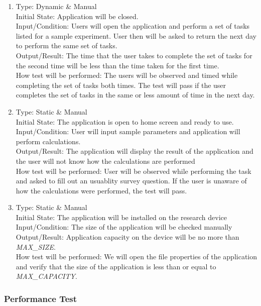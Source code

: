 \documentclass[12pt, titlepage]{article}
\begin{document}
\begin{adjustwidth}{2.2em}{0pt}
\begin{enumerate}[{NF-UT}1.]
  \item Type: Dynamic \& Manual\\
  Initial State: Application will be closed.\\
  Input/Condition: Users will open the application and perform a set of tasks listed for a sample experiment. User then will be asked to return the next day to perform the same set of tasks.\\
  Output/Result:  The time that the user takes to complete the set of tasks for the second time will be less than the time taken for the first time.\\
  How test will be performed: The users will be observed and timed while completing the set of tasks both times. The test will pass if the user completes the set of tasks in the same or less amount of time in the next day.

  \item Type: Static \& Manual\\
  Initial State: The application is open to home screen and ready to use.\\
  Input/Condition: User will input sample parameters and application will perform calculations.\\
  Output/Result: The application will display the result of the application and the user will not know how the calculations are performed \\
  How test will be performed: User will be observed while performing the task and asked to fill out an usuablity survey question. If the user is unaware of how the calculations were performed, the test will pass.

  \item Type: Static \& Manual\\
  Initial State: The application will be installed on the research device\\
  Input/Condition: The size of the application will be checked manually\\
  Output/Result: Application capacity on the device will be no more than \textsl{MAX\_SIZE}. \\
  How test will be performed: We will open the file properties of the application and verify that the size of the application is less than or equal to \textsl{MAX\_CAPACITY}.
\end{enumerate}
\end{adjustwidth}

\subsubsection{Performance Test}
\end{document}
